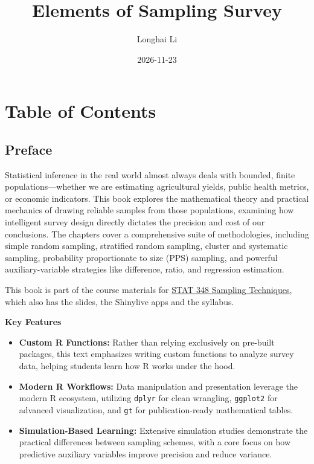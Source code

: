 \documentclass[
  letterpaper,
  DIV=11,
  numbers=noendperiod]{scrreprt}
\title{Elements of Sampling Survey}
\author{Longhai Li}
\date{2026-11-23}
\providecommand{\tightlist}{%
  \setlength{\itemsep}{0pt}\setlength{\parskip}{0pt}}
\renewcommand{\[}{\begin{equation}}
\renewcommand{\]}{\end{equation}}
\renewcommand*\contentsname{Table of contents}
\newcommand\contentsname{Table of contents}
\begin{document}
\maketitle

\renewcommand*\contentsname{Table of contents}
{
\setcounter{tocdepth}{2}
\tableofcontents
}


\chapter*{Table of Contents}\label{table-of-contents}


\section*{Preface}\label{preface}


Statistical inference in the real world almost always deals with
bounded, finite populations---whether we are estimating agricultural
yields, public health metrics, or economic indicators. This book
explores the mathematical theory and practical mechanics of drawing
reliable samples from those populations, examining how intelligent
survey design directly dictates the precision and cost of our
conclusions. The chapters cover a comprehensive suite of methodologies,
including simple random sampling, stratified random sampling, cluster
and systematic sampling, probability proportionate to size (PPS)
sampling, and powerful auxiliary-variable strategies like difference,
ratio, and regression estimation.

This book is part of the course materials for \href{../index.html}{STAT
348 Sampling Techniques}, which also has the slides, the Shinylive apps
and the syllabus.

\textbf{Key Features}

\begin{itemize}
\tightlist
\item
  \textbf{Custom R Functions:} Rather than relying exclusively on
  pre-built packages, this text emphasizes writing custom functions to
  analyze survey data, helping students learn how R works under the
  hood.
\item
  \textbf{Modern R Workflows:} Data manipulation and presentation
  leverage the modern R ecosystem, utilizing \texttt{dplyr} for clean
  wrangling, \texttt{ggplot2} for advanced visualization, and
  \texttt{gt} for publication-ready mathematical tables.
\item
  \textbf{Simulation-Based Learning:} Extensive simulation studies
  demonstrate the practical differences between sampling schemes, with a
  core focus on how predictive auxiliary variables improve precision and
  reduce variance.
\end{itemize}
\end{document}
